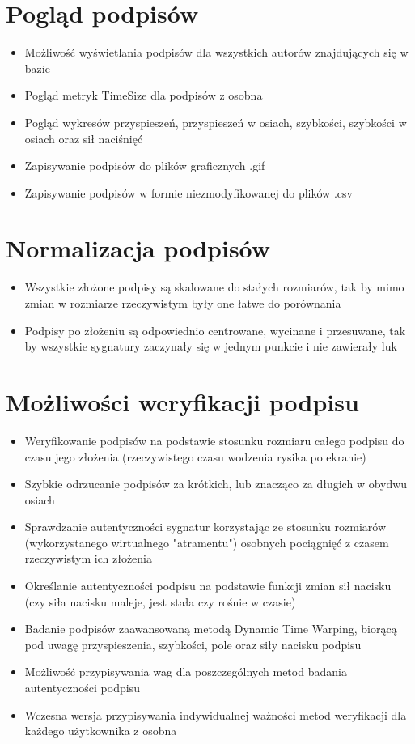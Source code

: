 \documentclass[notitlepage, oneside]{report}
\begin{document}
 \section*{Pogląd podpisów}
\begin{itemize}
  \item Możliwość wyświetlania podpisów dla wszystkich autorów znajdujących się w bazie
  \item Pogląd metryk TimeSize dla podpisów z osobna
  \item Pogląd wykresów przyspieszeń, przyspieszeń w osiach, szybkości, szybkości w osiach oraz sił naciśnięć
  \item Zapisywanie podpisów do plików graficznych .gif
  \item Zapisywanie podpisów w formie niezmodyfikowanej do plików .csv
 \end{itemize}
 \section*{Normalizacja podpisów}
\begin{itemize}
  \item Wszystkie złożone podpisy są skalowane do stałych rozmiarów, tak by mimo zmian w rozmiarze rzeczywistym były one łatwe do porównania
  \item Podpisy po złożeniu są odpowiednio centrowane, wycinane i przesuwane, tak by wszystkie sygnatury zaczynały się w jednym punkcie i nie zawierały luk
 \end{itemize}
\section*{Możliwości weryfikacji podpisu}
\begin{itemize}
  \item Weryfikowanie podpisów na podstawie stosunku rozmiaru całego podpisu do czasu jego złożenia (rzeczywistego czasu wodzenia rysika po ekranie)
  \item Szybkie odrzucanie podpisów za krótkich, lub znacząco za długich w obydwu osiach
  \item Sprawdzanie autentyczności sygnatur korzystając ze stosunku rozmiarów (wykorzystanego wirtualnego "atramentu") osobnych pociągnięć z czasem rzeczywistym ich złożenia
  \item Określanie autentyczności podpisu na podstawie funkcji zmian sił nacisku (czy siła nacisku maleje, jest stała czy rośnie w czasie)
  \item Badanie podpisów zaawansowaną metodą Dynamic Time Warping, biorącą pod uwagę przyspieszenia, szybkości, pole oraz siły nacisku podpisu
  \item Możliwość przypisywania wag dla poszczególnych metod badania autentyczności podpisu
  \item Wczesna wersja przypisywania indywidualnej ważności metod weryfikacji dla każdego użytkownika z osobna
 \end{itemize}
\end{document}
